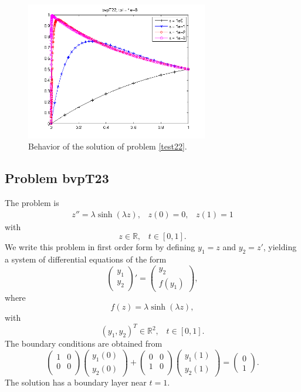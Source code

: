\documentclass[<options>]{article}
\def \RR {{\mathbb{R}}}
\begin{document}
\begin{figure}[htb]
\centerline{\includegraphics[height=6cm]{Prob22}}
\caption{Behavior of the solution of problem \ref{test22}.}
\end{figure}
\newpage
\subsection{Problem bvpT23}\label{test23}
The problem is 
\begin{eqnarray*}
z'' = \lambda \sinh(\lambda z), \;\;\;z(0) = 0, \;\;\; z(1) = 1
\end{eqnarray*}
with
\[
z \in \RR, \;\;\; t\in [0,1].
\]
We write this problem in first order form by defining $y_1=z$ and $y_2=z'$, yielding a system of differential equations of the form
\begin{equation*}
\left(\begin{array}{c}
y_1\\
y_2
\end{array}\right)'=
\left(\begin{array}{c}
y_2\\
f(y_1)
\end{array}\right),
\end{equation*}
where
\begin{equation*}
f(z) =\lambda \sinh(\lambda z),
\end{equation*}
with
\[
(y_1,y_2)^T \in \RR^{2}, \;\;\;  t \in [0,1].
\]
The  boundary conditions are obtained from
\begin{equation*}
\left(
  \begin{array}{cc}
    1 & 0 \\
    0 & 0 \\
  \end{array}
\right)
\left(\begin{array}{c}
y_{1}(0)\\
y_{2}(0)
\end{array}\right)
+
\left(
  \begin{array}{cc}
    0 & 0 \\
    1 & 0 \\
  \end{array}
\right)
\left(\begin{array}{c}
y_{1}(1)\\
y_{2}(1)
\end{array}\right)=\left(\begin{array}{c}
0 \\
1
\end{array}\right).
\end{equation*}
The solution has a boundary layer near $t = 1.$
\end{document}
